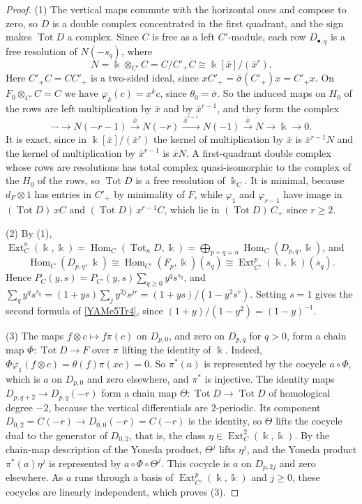 \documentclass[reqno]{amsart}
\numberwithin{equation}{section}
\theoremstyle{definition}
\theoremstyle{remark}
\theoremstyle{plain}
\newcommand{\kk}{\Bbbk}
\DeclareMathOperator{\Ext}{Ext}
\DeclareMathOperator{\Hom}{Hom}
\DeclareMathOperator{\Tot}{Tot}
\begin{document}
\begin{proof}
(1) The vertical maps commute with the horizontal ones and compose to zero, so $D$ is a double complex concentrated in the first quadrant, and the sign makes $\Tot D$ a complex. Since $C$ is free as a left $C'$-module, each row $D_{\bullet,q}$ is a free resolution of $N(-s_q)$, where
\[
N=\kk\otimes_{C'}C=C/C'_+C\cong\kk[\bar x]/(\bar x^r).
\]
Here $C'_+C=CC'_+$ is a two-sided ideal, since $xC'_+=\bar\sigma(C'_+)x=C'_+x$. On $F_0\otimes_{C'}C=C$ we have $\varphi_k(c)=x^kc$, since $\theta_0=\bar\sigma$. So the induced maps on $H_0$ of the rows are left multiplication by $\bar x$ and by $\bar x^{r-1}$, and they form the complex
\[
\cdots\to N(-r-1)\xrightarrow{\ \bar x\ }N(-r)\xrightarrow{\ \bar x^{r-1}\ }N(-1)\xrightarrow{\ \bar x\ }N\to\kk\to0.
\]
It is exact, since in $\kk[\bar x]/(\bar x^r)$ the kernel of multiplication by $\bar x$ is $\bar x^{r-1}N$ and the kernel of multiplication by $\bar x^{r-1}$ is $\bar xN$. A first-quadrant double complex whose rows are resolutions has total complex quasi-isomorphic to the complex of the $H_0$ of the rows, so $\Tot D$ is a free resolution of $\kk_C$. It is minimal, because $d_F\otimes1$ has entries in $C'_+$ by minimality of $F$, while $\varphi_1$ and $\varphi_{r-1}$ have image in $(\Tot D)\,xC$ and $(\Tot D)\,x^{r-1}C$, which lie in $(\Tot D)\,C_+$ since $r\ge2$.

(2) By (1), $\Ext^n_C(\kk,\kk)=\Hom_C(\Tot_nD,\kk)=\bigoplus_{p+q=n}\Hom_C(D_{p,q},\kk)$, and
\[
\Hom_C(D_{p,q},\kk)\cong\Hom_{C'}(F_p,\kk)(s_q)\cong\Ext^p_{C'}(\kk,\kk)(s_q).
\]
Hence $P_C(y,s)=P_{C'}(y,s)\sum_{q\ge0}y^qs^{s_q}$, and $\sum_qy^qs^{s_q}=(1+ys)\sum_jy^{2j}s^{jr}=(1+ys)/(1-y^2s^r)$. Setting $s=1$ gives the second formula of \eqref{YAMe5Tr4}, since $(1+y)/(1-y^2)=(1-y)^{-1}$.

(3) The maps $f\otimes c\mapsto f\pi(c)$ on $D_{p,0}$, and zero on $D_{p,q}$ for $q>0$, form a chain map $\Phi\colon\Tot D\to F$ over $\pi$ lifting the identity of $\kk$. Indeed, $\Phi\varphi_1(f\otimes c)=\theta(f)\pi(xc)=0$. So $\pi^*(a)$ is represented by the cocycle $a\circ\Phi$, which is $a$ on $D_{p,0}$ and zero elsewhere, and $\pi^*$ is injective. The identity maps $D_{p,q+2}\to D_{p,q}(-r)$ form a chain map $\Theta\colon\Tot D\to\Tot D$ of homological degree $-2$, because the vertical differentials are $2$-periodic. Its component $D_{0,2}=C(-r)\to D_{0,0}(-r)=C(-r)$ is the identity, so $\Theta$ lifts the cocycle dual to the generator of $D_{0,2}$, that is, the class $\eta\in\Ext^2_C(\kk,\kk)$. By the chain-map description of the Yoneda product, $\Theta^j$ lifts $\eta^j$, and the Yoneda product $\pi^*(a)\eta^j$ is represented by $a\circ\Phi\circ\Theta^j$. This cocycle is $a$ on $D_{p,2j}$ and zero elsewhere. As $a$ runs through a basis of $\Ext^p_{C'}(\kk,\kk)$ and $j\ge0$, these cocycles are linearly independent, which proves (3).
\end{proof}
\end{document}
